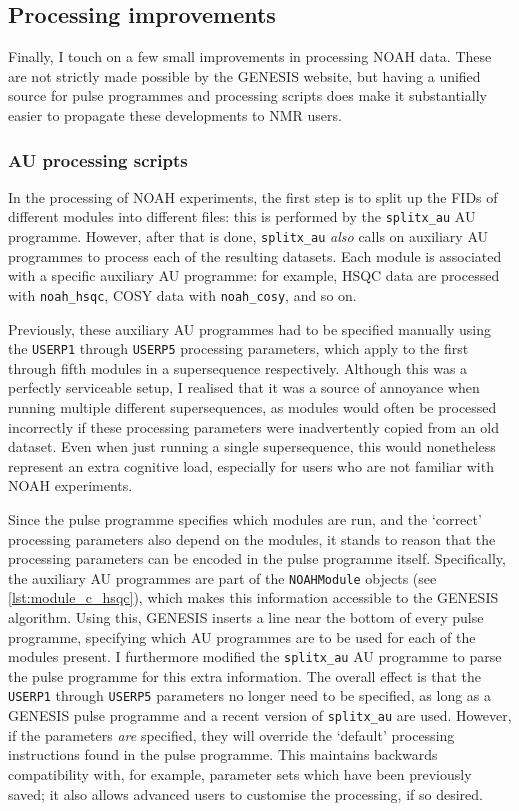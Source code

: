 \subsection{Processing improvements}
\label{subsec:noah__genesis_processing}

Finally, I touch on a few small improvements in processing NOAH data.
These are not strictly made possible by the GENESIS website, but having a unified source for pulse programmes and processing scripts does make it substantially easier to propagate these developments to NMR users.


\subsubsection{AU processing scripts}

In the processing of NOAH experiments, the first step is to split up the FIDs of different modules into different files: this is performed by the \texttt{splitx\_au} AU programme.
However, after that is done, \texttt{splitx\_au} \textit{also} calls on auxiliary AU programmes to process each of the resulting datasets.
Each module is associated with a specific auxiliary AU programme: for example, HSQC data are processed with \texttt{noah\_hsqc}, COSY data with \texttt{noah\_cosy}, and so on.

Previously, these auxiliary AU programmes had to be specified manually using the \texttt{USERP1} through \texttt{USERP5} processing parameters, which apply to the first through fifth modules in a supersequence respectively.
Although this was a perfectly serviceable setup, I realised that it was a source of annoyance when running multiple different supersequences, as modules would often be processed incorrectly if these processing parameters were inadvertently copied from an old dataset.
Even when just running a single supersequence, this would nonetheless represent an extra cognitive load, especially for users who are not familiar with NOAH experiments.

Since the pulse programme specifies which modules are run, and the `correct' processing parameters also depend on the modules, it stands to reason that the processing parameters can be encoded in the pulse programme itself.
Specifically, the auxiliary AU programmes are part of the \texttt{NOAHModule} objects (see \cref{lst:module_c_hsqc}), which makes this information accessible to the GENESIS algorithm.
Using this, GENESIS inserts a line near the bottom of every pulse programme, specifying which AU programmes are to be used for each of the modules present.
I furthermore modified the \texttt{splitx\_au} AU programme to parse the pulse programme for this extra information.
The overall effect is that the \texttt{USERP1} through \texttt{USERP5} parameters no longer need to be specified, as long as a GENESIS pulse programme and a recent version of \texttt{splitx\_au} are used.
However, if the parameters \textit{are} specified, they will override the `default' processing instructions found in the pulse programme.
This maintains backwards compatibility with, for example, parameter sets which have been previously saved; it also allows advanced users to customise the processing, if so desired.



